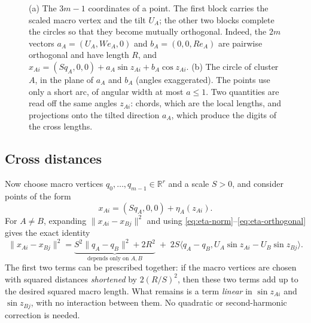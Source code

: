 \documentclass[11pt]{amsart}
\numberwithin{equation}{section}
\theoremstyle{definition}
\theoremstyle{remark}
\newcommand{\R}{\mathbb R}
\newcommand{\ip}[2]{\langle #1,#2\rangle}
\newcommand{\norm}[1]{\lVert #1\rVert}
\begin{document}
\begin{figure}[t]
\caption{(a) The $3m-1$ coordinates of a point. The first block carries
the scaled macro vertex and the tilt $U_A$; the other two blocks complete
the circles so that they become mutually orthogonal. Indeed, the $2m$
vectors $a_A=(U_A,We_A,0)$ and $b_A=(0,0,Re_A)$ are pairwise orthogonal
and have length $R$, and $x_{Ai}=(Sq_A,0,0)+a_A\sin z_{Ai}+b_A\cos z_{Ai}$.
(b) The circle of cluster $A$, in the plane of $a_A$ and $b_A$ (angles
exaggerated). The points use only a short arc, of angular width at most
$a\le1$. Two quantities are read off
the same angles $z_{Ai}$: chords, which are the local lengths, and
projections onto the tilted direction $a_A$, which produce the digits of
the cross lengths.}
\label{fig:circle}
\end{figure}

\subsection*{Cross distances}
Now choose macro vertices $q_0,\dots,q_{m-1}\in\R^r$ and a scale $S>0$,
and consider points of the form
\begin{equation}\label{eq:points}
 x_{Ai}=(Sq_A,0,0)+\eta_A(z_{Ai}).
\end{equation}
For $A\ne B$, expanding $\norm{x_{Ai}-x_{Bj}}^2$ and using
\eqref{eq:eta-norm}--\eqref{eq:eta-orthogonal} gives the exact identity
\begin{equation}\label{eq:cross-expansion}
 \norm{x_{Ai}-x_{Bj}}^2
 =\underbrace{S^2\norm{q_A-q_B}^2+2R^2}_{\text{depends only on }A,B}
 \;+\;2S\ip{q_A-q_B}{U_A\sin z_{Ai}-U_B\sin z_{Bj}}.
\end{equation}
The first two terms can be prescribed together: if the macro vertices are
chosen with squared distances \emph{shortened} by $2(R/S)^2$, then these
two terms add up to the desired squared macro length. What remains is a
term \emph{linear} in $\sin z_{Ai}$ and $\sin z_{Bj}$, with no interaction
between them. No quadratic or second-harmonic correction is needed.
\end{document}
